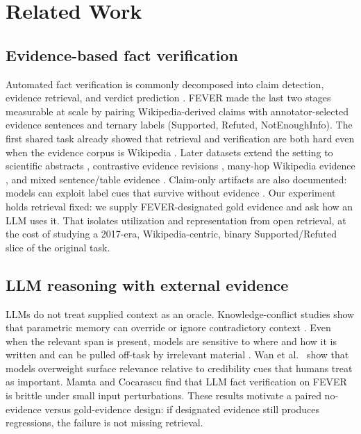 \section{Related Work}
\label{sec:related}

\subsection{Evidence-based fact verification}
Automated fact verification is commonly decomposed into claim detection, evidence retrieval, and verdict prediction \citep{guo-etal-2022-survey}.
FEVER \citep{thorne-etal-2018-fever} made the last two stages measurable at scale by pairing Wikipedia-derived claims with annotator-selected evidence sentences and ternary labels (Supported, Refuted, NotEnoughInfo).
The first shared task already showed that retrieval and verification are both hard even when the evidence corpus is Wikipedia \citep{thorne-etal-2018-fact}.
Later datasets extend the setting to scientific abstracts \citep{wadden-etal-2020-fact}, contrastive evidence revisions \citep{schuster-etal-2021-get}, many-hop Wikipedia evidence \citep{jiang-etal-2020-hover}, and mixed sentence/table evidence \citep{aly-etal-2021-feverous}.
Claim-only artifacts are also documented: models can exploit label cues that survive without evidence \citep{schuster-etal-2019-towards}.
Our experiment holds retrieval fixed: we supply FEVER-designated gold evidence and ask how an LLM uses it.
That isolates utilization and representation from open retrieval, at the cost of studying a 2017-era, Wikipedia-centric, binary Supported/Refuted slice of the original task.

\subsection{LLM reasoning with external evidence}
LLMs do not treat supplied context as an oracle.
Knowledge-conflict studies show that parametric memory can override or ignore contradictory context \citep{longpre-etal-2021-entity}.
Even when the relevant span is present, models are sensitive to where and how it is written \citep{liu-etal-2024-lost} and can be pulled off-task by irrelevant material \citep{shi2023distracted}.
Wan et al.\ \citep{wan-etal-2024-evidence} show that models overweight surface relevance relative to credibility cues that humans treat as important.
Mamta and Cocarascu \citep{mamta-cocarascu-2025-facteval} find that LLM fact verification on FEVER is brittle under small input perturbations.
These results motivate a paired no-evidence versus gold-evidence design: if designated evidence still produces regressions, the failure is not missing retrieval.

